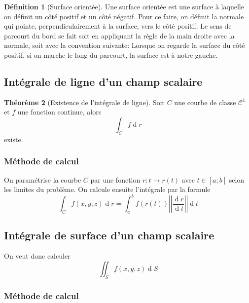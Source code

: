 \documentclass[11pt,a4paper]{article}
\theoremstyle{definition}
\newtheorem{mydef}{Définition}%
\newtheorem{mytheo}[mydef]{Théorème}
\DeclareMathOperator{\diff}{d}
\newcommand{\dif}{\diff\!}
\begin{document}
\begin{mydef}[Surface orientée]
	Une surface orientée est une surface à laquelle on définit un côté positif et un côté négatif.
	Pour ce faire, on définit la normale qui pointe, perpendiculairement à la surface, vers le côté positif.
	Le sens de parcourt du bord se fait soit en appliquant la règle de la main droite avec la normale,
	soit avec la convention suivante:
	Lorsque on regarde la surface du côté positif, si on marche le long du parcourt, la surface est à notre gauche.
\end{mydef}

\subsection{Intégrale de ligne d'un champ scalaire}

\begin{mytheo}[Existence de l'intégrale de ligne]
	Soit $C$ une courbe de classe $\mathcal{C}^1$ et $f$ une fonction continue, alors
	\[ \int_C f \dif r \]
	existe.
\end{mytheo}

\subsubsection{Méthode de calcul}

On paramétrise la courbe $C$ par une fonction $r : t \to r(t)$ avec $t \in [a;b]$ selon les limites du problème. On calcule ensuite l'intégrale par la formule
\[ \int_C f(x,y,z) \dif r = \int_a^b f(r(t)) \left|\left| \frac{\dif r}{\dif t} \right|\right| \dif t \]

\subsection{Intégrale de surface d'un champ scalaire}

On veut donc calculer
\[ \iint_S f(x,y,z) \dif S \]

\subsubsection{Méthode de calcul}
\end{document}
